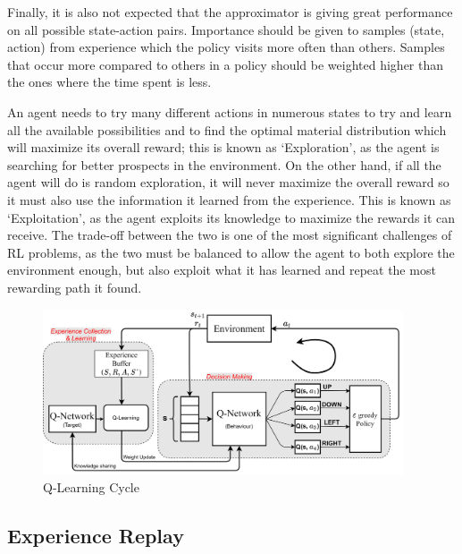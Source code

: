 Finally, it is also not expected that the approximator is giving great performance on all possible state-action pairs. Importance should be given to samples (state, action) from experience which the policy visits more often than others. Samples that occur more compared to others in a policy should be weighted higher than the ones where the time spent is less.  

An agent needs to try many different actions in numerous states to try and learn all the available possibilities and to find the optimal material distribution which will maximize its overall reward; this is known as `Exploration', as the agent is searching for better prospects in the environment. On the other hand, if all the agent will do is random exploration, it will never maximize the overall reward so it must also use the information it learned from the experience. This is known as `Exploitation', as the agent exploits its knowledge to maximize the rewards it can receive.
The trade-off between the two is one of the most significant challenges of RL problems, as the two must be balanced to allow the agent to both explore the environment enough, but also exploit what it has learned and repeat the most rewarding path it found.

\begin{figure}[h!]
    \centering
    \includegraphics[width=0.95\textwidth]{Figures/Ch_RL/QL_full_in_depth.png}
    \caption{Q-Learning Cycle}
    \label{fig:RL_Q_learning_cycle}
\end{figure}

\subsection{Experience Replay}
\label{section:RL_Experience_Replay}

